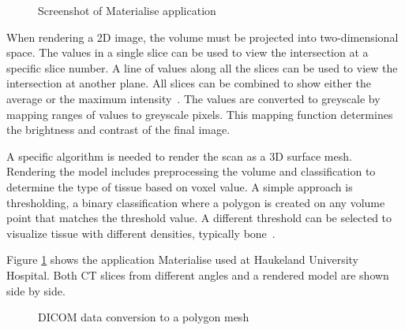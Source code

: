 \documentclass[a4paper]{report}
\begin{document}
\begin{figure}[h!]
    \centering
	\hfill
	\caption{Screenshot of Materialise application \cite{materialise_medical_nodate}}
 \label{mat}
\end{figure}

When rendering a 2D image, the volume must be projected into two-dimensional space. The values in a single slice can be used to view the intersection at a specific slice number. A line of values along all the slices can be used to view the intersection at another plane.
All slices can be combined to show either the average or the maximum intensity~\cite{fishman_volume_2006}.
The values are converted to greyscale by mapping ranges of values to greyscale pixels. This mapping function determines the brightness and contrast of the final image.

A specific algorithm is needed to render the scan as a 3D surface mesh. Rendering the model includes preprocessing the volume and classification to determine the type of tissue based on voxel value. A simple approach is thresholding, a binary classification where a polygon is created on any volume point that matches the threshold value. A different threshold can be selected to visualize tissue with different densities, typically bone~\cite{fishman_volume_2006}.

Figure \ref{mat} shows the application Materialise used at Haukeland University Hospital. Both CT slices from different angles and a rendered model are shown side by side.

\begin{figure}[h!]
    \centering
	\hfill
  \caption{DICOM data conversion to a polygon mesh}
  \label{dicom}
\end{figure}
\end{document}
